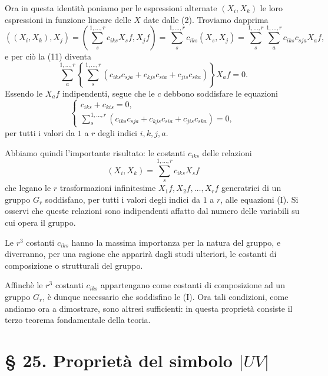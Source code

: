 \documentclass[11pt]{book}
\begin{document}
Ora in questa identità poniamo per le espressioni alternate $(X_i,X_k)$ le loro espressioni in funzione lineare delle $X$ date dalle (2). Troviamo dapprima
\[
 ((X_i,X_k),X_j)=
 \left(\sum\limits_s^{1,\ldots,r}c_{iks}X_sf, X_jf\right)
 =\sum\limits_s^{1,\ldots,r}c_{iks}(X_s,X_j)
 =\sum\limits_s^{1,\ldots,r}\sum\limits_a^{1,\ldots,r}c_{iks}c_{sja}X_af,
\]
e per ciò la (11) diventa
\[
 \sum\limits_a^{1,\ldots,r}\left\{\sum\limits_s^{1,\ldots,r}(c_{iks}c_{sja}+c_{kjs}c_{sia}+c_{jis}c_{ska})\right\}X_af=0.
\]
Essendo le $X_af$ indipendenti, segue che le $c$ debbono soddisfare le equazioni
\begin{equation*}\tag{I}
\begin{cases}
 c_{iks}+c_{kis}=0,\\[2mm]
 \displaystyle\sum\limits_s^{1,\ldots,r}
  \left(c_{iks}c_{sja}+c_{kjs}c_{sia}+c_{jis}c_{ska}\right)=0,
\end{cases}
\end{equation*}
per tutti i valori da $1$ a $r$ degli indici $i,k,j,a$.

Abbiamo quindi l'importante risultato: le costanti $c_{iks}$ delle relazioni
\[
 (X_i,X_k)=\sum\limits_s^{1,\ldots,r}c_{iks}X_sf
\]
che legano le $r$ trasformazioni infinitesime $X_1f,X_2f,\ldots,X_rf$ generatrici di un gruppo $G_r$ soddisfano, per tutti i valori degli indici da $1$ a $r$, alle equazioni (I). Si osservi che queste relazioni sono indipendenti affatto dal numero delle variabili su cui opera il gruppo.

Le $r^3$ costanti $c_{iks}$ hanno la massima importanza per la natura del gruppo, e diverranno, per una ragione che apparirà dagli studi ulteriori, le costanti di composizione o strutturali del gruppo.

Affinchè le $r^3$ costanti $c_{iks}$ appartengano come costanti di composizione ad un gruppo $G_r$, è dunque necessario che soddisfino le (I). Ora tali condizioni, come andiamo ora a dimostrare, sono altresì sufficienti: in questa proprietà consiste il terzo teorema fondamentale della teoria.

\section*{\S{} 25. Proprietà del simbolo $\lvert UV\rvert$}
\end{document}
